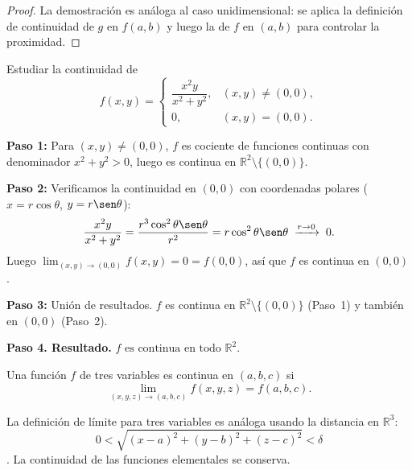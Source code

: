 \begin{proof}
La demostración es análoga al caso unidimensional: se aplica la
definición de continuidad de $g$ en $f(a,b)$ y luego la de $f$ en
$(a,b)$ para controlar la proximidad.
\end{proof}

\begin{example}
Estudiar la continuidad de
\[
f(x,y)=
\begin{cases}
\dfrac{x^2 y}{x^2+y^2}, & (x,y)\neq (0,0),\\[8pt]
0, & (x,y)=(0,0).
\end{cases}
\]
\begin{myproof}
\textbf{Paso 1:} Para $(x,y)\neq(0,0)$, $f$ es cociente de funciones continuas
con denominador $x^2+y^2>0$, luego es continua en
$\mathbb{R}^2\setminus\{(0,0)\}$.

\textbf{Paso 2:} Verificamos la continuidad en $(0,0)$ con coordenadas polares
($x=r\cos\theta$, $y=r\sen\theta$):
\[
\frac{x^2 y}{x^2+y^2} = \frac{r^3\cos^2\theta\sen\theta}{r^2}
= r\cos^2\theta\sen\theta \;\xrightarrow{r\to 0}\; 0.
\]
Luego $\lim_{(x,y)\to(0,0)} f(x,y)=0=f(0,0)$, así que $f$ es continua en $(0,0)$.

\textbf{Paso 3:} Unión de resultados. $f$ es continua en
$\mathbb{R}^2\setminus\{(0,0)\}$ (Paso~1) y también en $(0,0)$ (Paso~2).

\textbf{Paso 4. Resultado.}
$\boxed{f \text{ es continua en todo } \mathbb{R}^2}$.
\end{myproof}
\end{example}


\begin{definition}
Una función $f$ de tres variables es continua en $(a,b,c)$ si
\[
\lim_{(x,y,z)\to(a,b,c)} f(x,y,z) = f(a,b,c).
\]
\end{definition}

La definición de límite para tres variables es análoga usando la
distancia en $\mathbb{R}^3$: $$0<\sqrt{(x-a)^2+(y-b)^2+(z-c)^2}<\delta$$.
La continuidad de las funciones elementales se conserva.

